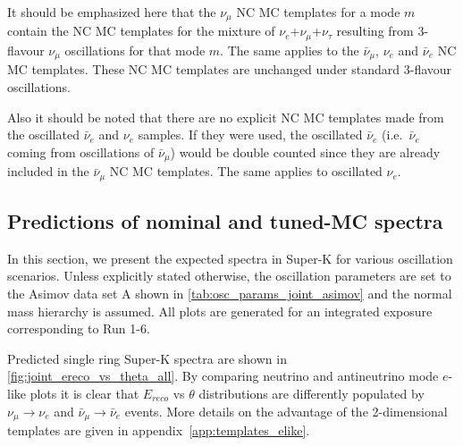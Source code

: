 It should be emphasized here that
the $\nu_{\mu}$ NC MC templates for a mode $m$ contain the
NC MC templates for the mixture of $\nu_{e}$+$\nu_{\mu}$+$\nu_{\tau}$ resulting from
3-flavour $\nu_{\mu}$ oscillations for that mode $m$. The same applies to the $\bar{\nu}_{\mu}$, $\nu_{e}$ and $\bar{\nu}_{e}$ 
NC MC templates. These NC MC templates are unchanged under standard 3-flavour oscillations.%

Also it should be noted that there are no explicit NC MC templates made from the oscillated $\bar{\nu}_{e}$ and $\nu_{e}$ 
samples. If they were used, the oscillated $\bar{\nu}_{e}$ (i.e.\ $\bar{\nu}_{e}$ coming from oscillations of $\bar{\nu}_{\mu}$) 
would be double counted since they are already included in the $\bar{\nu}_{\mu}$ NC MC templates. The same applies to oscillated 
$\nu_{e}$.


\subsection {Predictions of nominal and tuned-MC spectra}
\label{sec:nominal_and_tuned_predictions}

In this section, we present the expected spectra in Super-K for various oscillation scenarios. 
Unless explicitly stated otherwise, the oscillation 
parameters are set to the Asimov data set A shown in \cref{tab:osc_params_joint_asimov} and the normal mass hierarchy is assumed.
All plots are generated for an integrated exposure 
corresponding to Run 1-6.


Predicted single ring Super-K spectra are shown in \cref{fig:joint_ereco_vs_theta_all}. 
By comparing neutrino and antineutrino mode $e$-like plots it is clear that $E_{reco}$ vs $\theta$ distributions are differently populated
by $\nu_{\mu} \rightarrow \nu_e$ and $\bar{\nu}_{\mu} \rightarrow \bar{\nu}_e$ events.
More details on the advantage of the 2-dimensional templates are given in appendix~\ref{app:templates_elike}.

